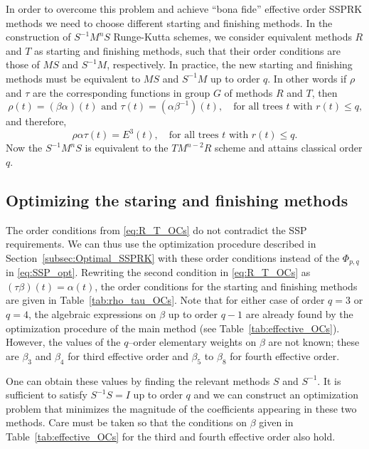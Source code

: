 In order to overcome this problem and achieve ``bona fide'' effective order SSPRK methods we 
need to choose different starting and finishing methods. 
In the construction of $S^{-1}M^nS$ Runge-Kutta schemes, we consider equivalent methods 
$R$ and $T$ as starting and finishing methods, such that their order conditions are those of 
$MS$ and $S^{-1}M$, respectively. 
In practice, the new starting and finishing methods must be equivalent to $MS$ and 
$S^{-1}M$ up to order $q$. 
In other words if $\rho$ and $\tau$ are the corresponding functions in group $G$ of methods $R$ and $T$, then
\begin{equation} \label{eq:R_T_OCs}
    \rho(t) = (\beta\alpha)(t) \text{ and } \tau(t) = (\alpha\beta^{-1})(t), \quad \text{for all 
    trees $t$ with $r(t) \leq q$,}
\end{equation}
and therefore,
\begin{equation} \label{eq:RMT_OCs}
    \rho\alpha\tau(t) = E^3(t), \quad \text{for all trees $t$ with $r(t) \leq q$.}
\end{equation}
Now the $S^{-1}M^nS$ is equivalent to the $TM^{n-2}R$ scheme and attains classical order $q$.

\subsection{Optimizing the staring and finishing methods}\label{subsubsec:opt_methods}
The order conditions from \eqref{eq:R_T_OCs} do not contradict the SSP requirements.  
We can thus use the optimization procedure described in Section~\ref{subsec:Optimal_SSPRK} 
with these order conditions instead of the $\Phi_{p,q}$ in \eqref{eq:SSP_opt}. 
Rewriting the second condition in \eqref{eq:R_T_OCs} as $(\tau\beta)(t) = \alpha(t)$, the 
order conditions for the starting and finishing methods are given in 
Table~\ref{tab:rho_tau_OCs}. 
Note that for either case of order $q=3$ or $q=4$, the algebraic expressions on 
$\beta$ up to order $q-1$ are already found by the optimization procedure of 
the main method (see Table~\ref{tab:effective_OCs}). 
However, the values of the $q$--order elementary weights on $\beta$ are not known; these 
are $\beta_3$ and $\beta_4$ for third effective order and $\beta_5$ to $\beta_8$ for fourth 
effective order. 

One can obtain these values by finding the relevant methods $S$ and $S^{-1}$. 
It is sufficient to satisfy $S^{-1}S = I$ up to order $q$ and we can construct an optimization 
problem that minimizes the magnitude of the coefficients appearing in these two methods.
Care must be taken so that the conditions on $\beta$ given in Table~\ref{tab:effective_OCs} for the third and fourth effective order also hold. 

